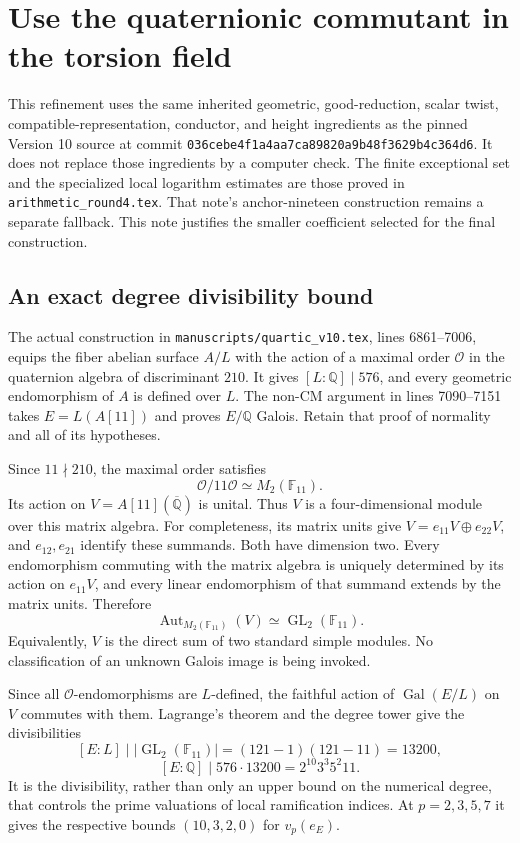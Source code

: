 \section{Use the quaternionic commutant in the torsion field}

This refinement uses the same inherited geometric, good-reduction, scalar
twist, compatible-representation, conductor, and height ingredients as
the pinned Version 10 source at commit
\texttt{036cebe4f1a4aa7ca89820a9b48f3629b4c364d6}. It does not replace
those ingredients by a computer check. The finite exceptional set and the
specialized local logarithm estimates are those proved in
\texttt{arithmetic\_round4.tex}. That note's anchor-nineteen construction
remains a separate fallback. This note justifies the smaller coefficient
selected for the final construction.

\subsection{An exact degree divisibility bound}

The actual construction in \texttt{manuscripts/quartic\_v10.tex},
lines 6861--7006, equips the fiber abelian surface $A/L$ with the action of
a maximal order $\mathcal O$ in the quaternion algebra of discriminant
$210$. It gives $[L:\mathbb Q]\mid576$, and every geometric
endomorphism of $A$ is defined over $L$. The non-CM argument in lines
7090--7151 takes $E=L(A[11])$ and proves $E/\mathbb Q$ Galois.
Retain that proof of normality and all of its hypotheses.

Since $11\nmid210$, the maximal order satisfies
\[
 \mathcal O/11\mathcal O\simeq M_2(\mathbb F_{11}).
\]
Its action on $V=A[11](\overline{\mathbb Q})$ is unital. Thus $V$ is
a four-dimensional module over this matrix algebra. For completeness,
its matrix units give $V=e_{11}V\oplus e_{22}V$, and $e_{12},e_{21}$
identify these summands. Both have dimension two. Every endomorphism
commuting with the matrix algebra is uniquely determined by its action
on $e_{11}V$, and every linear endomorphism of that summand extends by
the matrix units. Therefore
\[
 \operatorname{Aut}_{M_2(\mathbb F_{11})}(V)
       \simeq\operatorname{GL}_2(\mathbb F_{11}).
\]
Equivalently, $V$ is the direct sum of two standard simple modules.
No classification of an unknown Galois image is being invoked.

Since all $\mathcal O$-endomorphisms are $L$-defined, the faithful
action of $\operatorname{Gal}(E/L)$ on $V$ commutes with them. Lagrange's
theorem and the degree tower give the divisibilities
\[
 [E:L]\mid|\operatorname{GL}_2(\mathbb F_{11})|
       =(121-1)(121-11)=13200,
\]
\[
 [E:\mathbb Q]\mid576\cdot13200
       =2^{10}3^3 5^2 11.
\]
It is the divisibility, rather than only an upper bound on the numerical
degree, that controls the prime valuations of local ramification indices.
At $p=2,3,5,7$ it gives the respective bounds $(10,3,2,0)$ for
$v_p(e_E)$.

